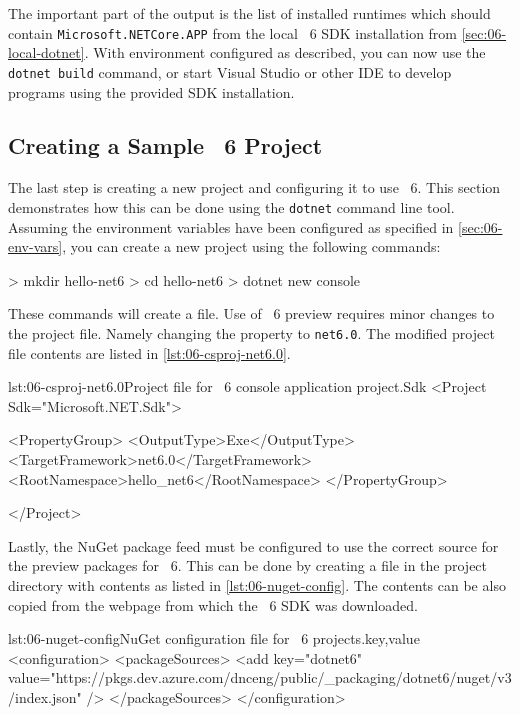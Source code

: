 The important part of the output is the list of installed \dotnet{} runtimes which should contain
\texttt{Microsoft.NETCore.APP} from the local \dotnet{}~6 SDK installation from
\autoref{sec:06-local-dotnet}. With environment configured as described, you can now use the
\verb|dotnet build| command, or start Visual Studio or other IDE to develop programs using the
provided SDK installation.

\subsection{Creating a Sample \dotnet{}~6 Project}

The last step is creating a new project and configuring it to use \dotnet{}~6. This section
demonstrates how this can be done using the \verb|dotnet| command line tool. Assuming the
environment variables have been configured as specified in \autoref{sec:06-env-vars}, you can create
a new project using the following commands:

\begin{myVerbatim}
> mkdir hello-net6
> cd hello-net6
> dotnet new console
\end{myVerbatim}

These commands will create a  file. Use of \dotnet{}~6
preview requires minor changes to the project file. Namely changing the 
property to \verb|net6.0|. The modified project file contents are listed in \autoref{lst:06-csproj-net6.0}.

\begin{myListingXml}{lst:06-csproj-net6.0}{Project file for \dotnet{}~6 console application project.}{Sdk}
<Project Sdk="Microsoft.NET.Sdk">

  <PropertyGroup>
    <OutputType>Exe</OutputType>
    <TargetFramework>net6.0</TargetFramework>
    <RootNamespace>hello_net6</RootNamespace>
  </PropertyGroup>

</Project>
\end{myListingXml}

Lastly, the NuGet package feed must be configured to use the correct source for the preview packages
for \dotnet{}~6. This can be done by creating a  file in the project
directory with contents as listed in \autoref{lst:06-nuget-config}. The contents can be also copied
from the webpage from which the \dotnet{}~6 SDK was downloaded.

\begin{myListingXml}[basicstyle=\ttfamily\scriptsize]{lst:06-nuget-config}{NuGet configuration file for \dotnet{}~6 projects.}{key,value}
<configuration>
  <packageSources>
    <add key="dotnet6"
      value="https://pkgs.dev.azure.com/dnceng/public/_packaging/dotnet6/nuget/v3/index.json" />
  </packageSources>
</configuration>
\end{myListingXml}

